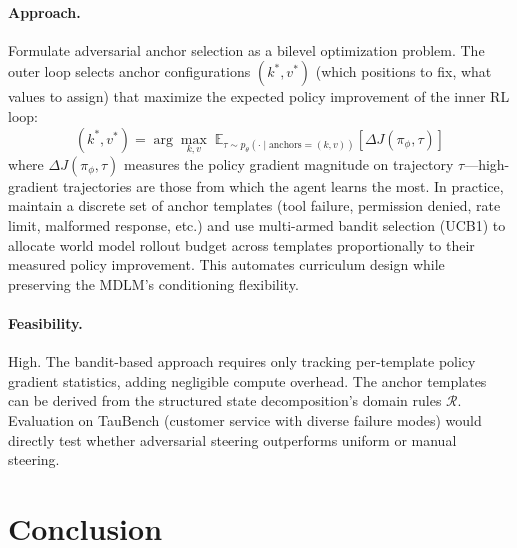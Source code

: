 \documentclass[11pt,a4paper]{article}
\begin{document}
\paragraph{Approach.}
Formulate adversarial anchor selection as a bilevel optimization problem. The outer loop selects anchor configurations $(k^*, v^*)$ (which positions to fix, what values to assign) that maximize the expected policy improvement of the inner RL loop:
\begin{equation}
    (k^*, v^*) = \arg\max_{k, v}\; \mathbb{E}_{\tau \sim p_\theta(\cdot \mid \text{anchors}=(k,v))} \left[ \Delta J(\pi_\phi, \tau) \right]
\end{equation}
where $\Delta J(\pi_\phi, \tau)$ measures the policy gradient magnitude on trajectory $\tau$---high-gradient trajectories are those from which the agent learns the most. In practice, maintain a discrete set of anchor templates (tool failure, permission denied, rate limit, malformed response, etc.) and use multi-armed bandit selection (UCB1) to allocate world model rollout budget across templates proportionally to their measured policy improvement. This automates curriculum design while preserving the MDLM's conditioning flexibility.

\paragraph{Feasibility.}
High. The bandit-based approach requires only tracking per-template policy gradient statistics, adding negligible compute overhead. The anchor templates can be derived from the structured state decomposition's domain rules $\mathcal{R}$. Evaluation on TauBench (customer service with diverse failure modes) would directly test whether adversarial steering outperforms uniform or manual steering.

\section{Conclusion}
\end{document}

